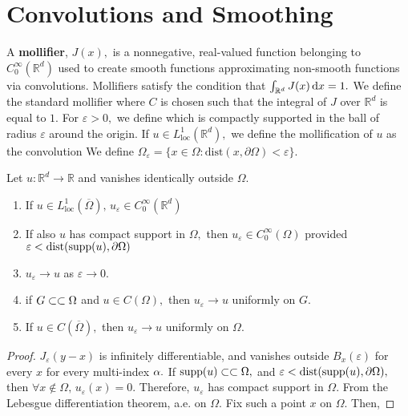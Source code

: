 \section{Convolutions and Smoothing}
A \textbf{mollifier}, $J(x),$ is a nonnegative, real-valued function belonging to $C_0^\infty(\mathbb{R}^d)$ used to create smooth functions approximating non-smooth functions via convolutions. Mollifiers satisfy the condition that $\int_{\mathbb{R}^d}J(x)\,\mathrm{d} x=1.$ We define the standard mollifier
where $C$ is chosen such that the integral of $J$ over $\mathbb{R}^d$ is equal to $1.$ For $\varepsilon>0,$ we define
which is compactly supported in the ball of radius $\varepsilon$ around the origin. If $u\in L^1_\mathrm{loc}(\mathbb{R}^d),$ we define the mollification of $u$ as the convolution
We define $\Omega_\varepsilon=\{x\in\Omega:\mathrm{dist}(x,\partial\Omega)<\varepsilon\}.$
\begin{theorem}
    Let $u:\mathbb{R}^d\rightarrow\mathbb{R}$ and vanishes identically outside $\Omega.$
    \begin{enumerate}
        \item If $u\in L^1_\mathrm{loc}(\overline{\Omega}),\,u_\varepsilon\in C_0^\infty(\mathbb{R}^d)$
        \item If also $u$ has compact support in $\Omega,$ then $u_\varepsilon\in C_0^\infty(\Omega)$ provided $\varepsilon<\mathrm{dist}(\mathrm{supp}(u),\partial\Omega)$
        \item $u_\varepsilon\rightarrow u$ as $\varepsilon\rightarrow0.$
        \item if $G\subset\subset\Omega$ and $u\in C(\Omega),$ then $u_\varepsilon\rightarrow u$ uniformly on $G.$
        \item If $u\in C(\overline{\Omega}),$ then $u_\varepsilon\rightarrow u$ uniformly on $\Omega.$
    \end{enumerate}
\end{theorem}
\begin{proof}
$J_\varepsilon(y-x)$ is infinitely differentiable, and vanishes outside $B_{x}(\varepsilon)$ for every $x$ for every multi-index $\alpha.$ If $\mathrm{supp}(u)\subset\subset\Omega,$ and $\varepsilon<\mathrm{dist} (\mathrm{supp}(u), \partial\Omega),$ then $\forall x\notin\Omega,\,u_\varepsilon(x)=0.$ Therefore, $u_\varepsilon$ has compact support in $\Omega.$
From the Lebesgue differentiation theorem,
a.e. on $\Omega.$ Fix such a point $x$ on $\Omega.$ Then,
\end{proof}


